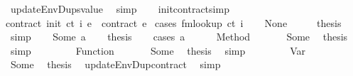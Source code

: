 \begin{isabellebody}
\ updateEnvDup{\isacharunderscore}{\kern0pt}svalue\ \isamarkupfalse%
\ simp\isanewline
\ \ \isamarkupfalse%
\isanewline
{}\isamarkupfalse%
%
\endisatagproof
{\isafoldproof}%
%
\isadelimproof
\isanewline
%
\endisadelimproof
\isanewline
{}\isamarkupfalse%
\ init{\isacharunderscore}{\kern0pt}contract{\isacharbrackleft}{\kern0pt}simp{\isacharbrackright}{\kern0pt}{\isacharcolon}{\kern0pt}\isanewline
{\isachardoublequoteopen}contract\ {\isacharparenleft}{\kern0pt}init\ ct\ i\ e{\isacharparenright}{\kern0pt}\ {\isacharequal}{\kern0pt}\ contract\ e{\isachardoublequoteclose}\isanewline
%
\isadelimproof
%
\endisadelimproof
%
\isatagproof
{}\isamarkupfalse%
\ {\isacharparenleft}{\kern0pt}cases\ {\isachardoublequoteopen}fmlookup\ ct\ i{\isachardoublequoteclose}{\isacharparenright}{\kern0pt}\isanewline
\ \ \isamarkupfalse%
\ None\isanewline
\ \ \isamarkupfalse%
\ \isamarkupfalse%
\ {\isacharquery}{\kern0pt}thesis\ \isamarkupfalse%
\ simp\isanewline
{}\isamarkupfalse%
\isanewline
\ \ \isamarkupfalse%
\ {\isacharparenleft}{\kern0pt}Some\ a{\isacharparenright}{\kern0pt}\isanewline
\ \ \isamarkupfalse%
\ {\isacharquery}{\kern0pt}thesis\isanewline
\ \ \isamarkupfalse%
\ {\isacharparenleft}{\kern0pt}cases\ a{\isacharparenright}{\kern0pt}\isanewline
\ \ \ \ \isamarkupfalse%
\ {\isacharparenleft}{\kern0pt}Method\ {\isacharunderscore}{\kern0pt}{\isacharparenright}{\kern0pt}\isanewline
\ \ \ \ \isamarkupfalse%
\ Some\ \isamarkupfalse%
\ {\isacharquery}{\kern0pt}thesis\ \isamarkupfalse%
\ simp\isanewline
\ \ \isamarkupfalse%
\isanewline
\ \ \ \ \isamarkupfalse%
\ {\isacharparenleft}{\kern0pt}Function\ {\isacharunderscore}{\kern0pt}{\isacharparenright}{\kern0pt}\isanewline
\ \ \ \ \isamarkupfalse%
\ Some\ \isamarkupfalse%
\ {\isacharquery}{\kern0pt}thesis\ \isamarkupfalse%
\ simp\isanewline
\ \ \isamarkupfalse%
\isanewline
\ \ \ \ \isamarkupfalse%
\ {\isacharparenleft}{\kern0pt}Var\ {\isacharunderscore}{\kern0pt}{\isacharparenright}{\kern0pt}\isanewline
\ \ \ \ \isamarkupfalse%
\ Some\ \isamarkupfalse%
\ {\isacharquery}{\kern0pt}thesis\ \isamarkupfalse%
\ updateEnvDup{\isacharunderscore}{\kern0pt}contract\ \isamarkupfalse%
\ simp\isanewline

\end{isabellebody}
